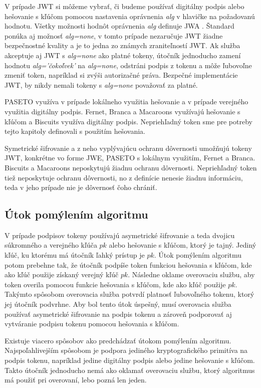 V prípade JWT si môžeme vybrať, či budeme používať digitálny podpis alebo hešovanie s kľúčom pomocou nastavenia oprávnenia \textit{alg} v hlavičke na požadovanú hodnotu. Všetky možnosti hodnôt oprávnenia \textit{alg} definuje  JWA \cite{jwa_rfc}. Štandard ponúka aj možnosť \textit{alg=none}, v tomto prípade nezaručuje JWT žiadne bezpečnostné kvality a je to jedna zo známych zraniteľností \cite{jwt_vul} JWT. Ak služba akceptuje aj JWT s \textit{alg=none} ako platné tokeny, útočník jednoducho zamení hodnotu \textit{alg='čokoľvek'} na \textit{alg=none}, odstráni podpis z tokenu a môže ľubovoľne zmeniť token, napríklad si zvýši autorizačné práva. Bezpečné implementácie JWT, by nikdy nemali tokeny s \textit{alg=none} považovať za platné.

PASETO využíva v prípade lokálneho využitia hešovanie a v prípade verejného využitia digitálny podpis. Fernet, Branca a Macaroons využívajú hešovanie s kľúčom a Biscuits využíva digitálny podpis. Nepriehľadný token sme pre potreby tejto kapitoly definovali s použitím hešovania.

Symetrické šifrovanie a z neho vyplývajúcu ochranu dôvernosti umožňujú tokeny JWT, konkrétne vo forme JWE, PASETO s lokálnym využitím, Fernet a Branca. Biscuits a Macaroons neposkytujú žiadnu ochranu dôvernosti. Nepriehľadný token tiež neposkytuje ochranu dôvernosti, no z definície nenesie žiadnu informáciu, teda v jeho prípade nie je dôvernosť čoho chrániť.

\subsection{Útok pomýlením algoritmu}

V prípade podpisov tokeny používajú asymetrické šifrovanie a teda dvojicu súkromného a verejného kľúča $pk$ alebo hešovanie s kľúčom, ktorý je tajný. Jediný kľúč, ku ktorému má útočník ľahký prístup je $pk$. Útok pomýlením algoritmu potom prebehne tak, že útočník podpíše token funkciou hešovania s kľúčom, kde ako kľúč použije získaný verejný kľúč $pk$. Následne oklame overovaciu službu, aby token overila pomocou funkcie hešovania s kľúčom, kde ako kľúč použije $pk$. Takýmto spôsobom overovacia služba potvrdí platnosť ľubovoľného tokenu, ktorý jej útočník podvrhne. Aby bol tento útok úspešný, musí overovacia služba používať asymetrické šifrovanie na podpis tokenu a zároveň podporovať aj vytváranie podpisu tokenu pomocou hešovania s kľúčom.

Existuje viacero spôsobov ako predchádzať útokom pomýlením algoritmu. Najspoľahlivejším spôsobom je podpora jediného kryptografického primitíva na podpis tokenu, napríklad jedine digitálny podpis alebo jedine hešovanie s kľúčom. Takto útočník jednoducho nemá ako oklamať overovaciu službu, ktorý algoritmus má použiť pri overovaní, lebo pozná len jeden. 

